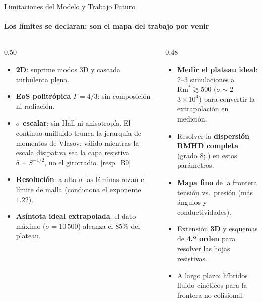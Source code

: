 \documentclass[aspectratio=169,9pt]{beamer}
\begin{document}
\begin{frame}{Limitaciones del Modelo y Trabajo Futuro}
\framesubtitle{Los l\'imites se declaran: son el mapa del trabajo por venir}
\begin{columns}[T]
\begin{column}{0.50\textwidth}
  \begin{tcolorbox}[WRN={Limitaciones declaradas de antemano}]
    \scriptsize
    \begin{itemize}\setlength\itemsep{2pt}
      \item \textbf{2D}: suprime modos 3D y cascada turbulenta plena.
      \item \textbf{EoS politr\'opica} $\Gamma=4/3$: sin composici\'on
            ni radiaci\'on.
      \item \textbf{$\sigma$ escalar}: sin Hall ni anisotrop\'ia.
            El continuo unifluido trunca la jerarqu\'ia de momentos de
            Vlasov; v\'alido mientras la escala disipativa sea la capa
            resistiva $\delta\sim S^{-1/2}$, no el girorradio.
            \hfill{\tiny[resp.\ B9]}
      \item \textbf{Resoluci\'on}: a alta $\sigma$ las l\'aminas rozan
            el l\'imite de malla (condiciona el exponente $1.22$).
      \item \textbf{As\'intota ideal extrapolada}: el dato m\'aximo
            ($\sigma=10\,500$) alcanza el $85\%$ del plateau.
    \end{itemize}
  \end{tcolorbox}
\end{column}
\begin{column}{0.48\textwidth}
  \pause
  \begin{tcolorbox}[RES={Trabajo futuro}]
    \scriptsize
    \begin{itemize}\setlength\itemsep{2pt}
      \item \textbf{Medir el plateau ideal}: 2--3 simulaciones a
            $\mathrm{Rm}^*\gtrsim500$ ($\sigma\sim2$--$3\times10^4$)
            para convertir la extrapolaci\'on en medici\'on.
      \item Resolver la \textbf{dispersi\'on RMHD completa} (grado 8;
            \citealp{osmanov-2008,chow2023}) en estos par\'ametros.
      \item \textbf{Mapa fino} de la frontera tensi\'on vs.\ presi\'on
            (m\'as \'angulos y conductividades).
      \item Extensi\'on \textbf{3D} y esquemas de \textbf{4.º orden}
            \citep{mignone2024} para resolver las hojas resistivas.
      \item A largo plazo: h\'ibridos fluido-cin\'eticos para la
            frontera no colisional.
    \end{itemize}
  \end{tcolorbox}
\end{column}
\end{columns}
\end{frame}
\end{document}
